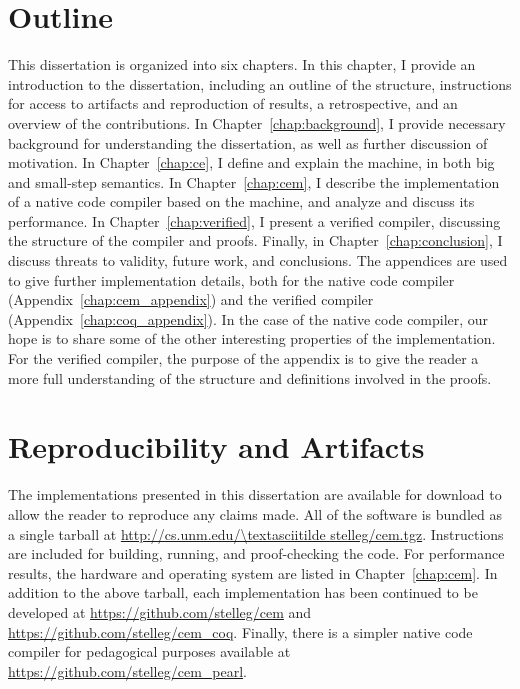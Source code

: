 \section{Outline}

This dissertation is organized into six chapters. In this chapter, I provide
an introduction to the dissertation, including an outline of the structure,
instructions for access to artifacts and reproduction of results, a
retrospective, and an overview of the contributions. In
Chapter~\ref{chap:background}, I provide necessary background for understanding
the dissertation, as well as further discussion of motivation. In
Chapter~\ref{chap:ce}, I define and explain the \ce machine, in both big and
small-step semantics. In Chapter~\ref{chap:cem}, I describe the implementation
of a native code compiler based on the \ce machine, and analyze and discuss its
performance. In Chapter~\ref{chap:verified}, I present a verified compiler,
discussing the structure of the compiler and proofs. Finally, in
Chapter~\ref{chap:conclusion}, I discuss threats to validity, future work, and
conclusions. The appendices are used to give further implementation details,
both for the native code compiler (Appendix~\ref{chap:cem_appendix}) and the
verified compiler (Appendix~\ref{chap:coq_appendix}). In the case of the native
code compiler, our hope is to share some of the other interesting properties of
the implementation.  For the verified compiler, the purpose of the appendix is
to give the reader a more full understanding of the structure and definitions
involved in the proofs.

\section{Reproducibility and Artifacts}

The implementations presented in this dissertation are available for download to
allow the reader to reproduce any claims made. All of the software is bundled as
a single tarball at \url{http://cs.unm.edu/\textasciitilde stelleg/cem.tgz}.
Instructions are included for building, running, and proof-checking the code.
For performance results, the hardware and operating system are listed in
Chapter~\ref{chap:cem}. In addition to the above tarball, each implementation has been
continued to be developed at \url{https://github.com/stelleg/cem} and
\url{https://github.com/stelleg/cem\_coq}. Finally, there is a simpler native
code compiler for pedagogical purposes available at
\url{https://github.com/stelleg/cem\_pearl}. 


